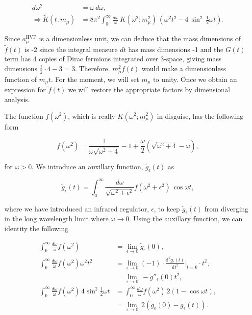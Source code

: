 \documentclass{article}
\numberwithin{equation}{section} %
\begin{document}
\begin{equation}
\begin{split}
d\omega^2 &= \omega \, d\omega ,\\
\Rightarrow \tilde{K}(t;m_\mu) &= 8\pi^2 \int_0^\infty \frac{d\omega}{\omega} \, K(\omega^2;m_\mu^2) \,\left( \omega^2t^2-4\,\sin^2\, \frac{1}{2}\omega t \right).
\end{split}
\end{equation}

Since $a_\mu^\mathrm{HVP}$  is a dimensionless unit, we can deduce that the mass dimensions of $\tilde{f}(t)$ is -2 since the integral measure $dt$ has mass dimensions -1 and the $G(t)$ term has 4 copies of Dirac fermions integrated over 3-space, giving mass dimensions $\frac{3}{2}\cdot 4 - 3 = 3$. Therefore, $m_\mu^2 \tilde{f}(t)$ would make a dimensionless function of $m_\mu t$. For the moment, we will set $m_\mu$ to unity. Once we obtain an expression for $\tilde{f}(t)$ we will restore the appropriate factors by dimensional analysis.

The function $f(\omega^2)$, which is really $K(\omega^2;m_\mu^2)$ in disguise, has the following form 

\begin{equation}
f(\omega^2) = \frac{1}{\omega\sqrt{\omega^2 + 4}} - 1 + \frac{\omega}{2}(\sqrt{\omega^2 + 4} - \omega),
\end{equation}

\noindent for $\omega>0$. We introduce an auxillary function, $\tilde{g}_\epsilon(t)$ as 

\begin{equation}
\tilde{g}_\epsilon(t) = \int^\infty_0 \frac{d\omega}{\sqrt{\omega^2 + \epsilon^2}} f(\omega^2 + \epsilon^2)\, \cos \omega t,
\label{aux func}
\end{equation}

\noindent where we have introduced an infrared regulator, $\epsilon$, to keep $\tilde{g}_\epsilon(t)$ from diverging in the long wavelength limit where $\omega\rightarrow 0$. Using the auxillary function, we can identity the following

\begin{equation}
\begin{split}
\int^\infty_0 \frac{d\omega}{\omega} f(\omega^2) &= \lim_{\epsilon\rightarrow 0} \tilde{g}_\epsilon(0),\\
\int^\infty_0 \frac{d\omega}{\omega} f(\omega^2)\omega^2 t^2 &= \lim_{\epsilon\rightarrow 0} (-1)\cdot\frac{\mathrm{d}^2\tilde{g}_\epsilon(t)}{\mathrm{d}t^2}\bigg\vert_{t=0} \cdot t^2,\\
&=\lim_{\epsilon\rightarrow 0} \, - \tilde{g}''_\epsilon(0)t^2,\\
\int^\infty_0 \frac{d\omega}{\omega} f(\omega^2)\,4 \sin^2 \frac{1}{2}\omega t &= \int^\infty_0 \frac{d\omega}{\omega} f(\omega^2)\,2(1- \cos\omega t) ,\\ 
&= \lim_{\epsilon\rightarrow 0}\, 2(\tilde{g}_\epsilon(0)-\tilde{g}_\epsilon(t)).
\end{split}
\end{equation}
\end{document}
